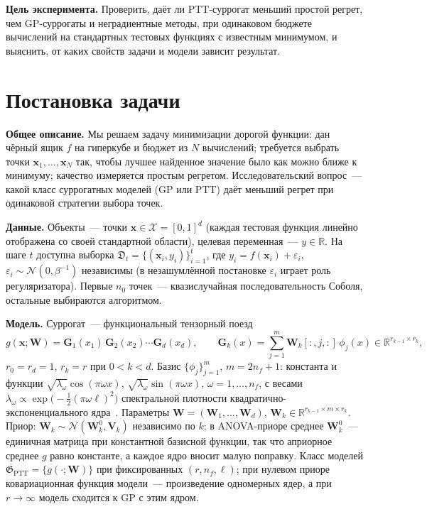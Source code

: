 \documentclass[11pt,a4paper]{article}
\newcommand{\X}{\mathcal X}
\newcommand{\R}{\mathbb R}
\newcommand{\x}{\mathbf x}
\newcommand{\W}{\mathbf W}
\newcommand{\G}{\mathbf G}
\begin{document}
\textbf{Цель эксперимента.} Проверить, даёт ли PTT-суррогат меньший простой регрет, чем GP-суррогаты и
неградиентные методы, при одинаковом бюджете вычислений на стандартных тестовых функциях с известным
минимумом, и выяснить, от каких свойств задачи и модели зависит результат.

\section{Постановка задачи}

\textbf{Общее описание.} Мы решаем задачу минимизации дорогой функции: дан чёрный ящик $f$ на
гиперкубе и бюджет из $N$ вычислений; требуется выбрать точки $\x_1,\dots,\x_N$ так, чтобы лучшее найденное
значение было как можно ближе к минимуму; качество измеряется простым регретом. Исследовательский вопрос~---
какой класс суррогатных моделей (GP или PTT) даёт меньший регрет при одинаковой стратегии выбора точек.

\textbf{Данные.} Объекты~--- точки $\x\in\X=[0,1]^d$ (каждая тестовая функция линейно отображена со своей
стандартной области), целевая переменная~--- $y\in\R$. На шаге $t$ доступна выборка
$\mathfrak D_t=\{(\x_i,y_i)\}_{i=1}^{t}$, где $y_i=f(\x_i)+\varepsilon_i$, $\varepsilon_i\sim\mathcal
N(0,\beta^{-1})$ независимы (в незашумлённой постановке $\varepsilon_i$ играет роль регуляризатора).
Первые $n_0$ точек~--- квазислучайная последовательность Соболя, остальные выбираются алгоритмом.

\textbf{Модель.} Суррогат~--- функциональный тензорный поезд
\begin{equation}\label{eq:ptt}
g(\x;\W)=\G_1(x_1)\,\G_2(x_2)\cdots\G_d(x_d),\qquad
\G_k(x)=\sum_{j=1}^{m}\W_k[:,j,:]\,\phi_j(x)\in\R^{r_{k-1}\times r_k},
\end{equation}
$r_0=r_d=1$, $r_k=r$ при $0<k<d$. Базис $\{\phi_j\}_{j=1}^{m}$, $m=2n_f+1$: константа и функции
$\sqrt{\lambda_\omega}\cos(\pi\omega x)$, $\sqrt{\lambda_\omega}\sin(\pi\omega x)$, $\omega=1,\dots,n_f$, с весами
$\lambda_\omega\propto\exp\bigl(-\tfrac12(\pi\omega\ell)^2\bigr)$ спектральной плотности квадратично-экспоненциального
ядра~\cite{solin2020hilbert}. Параметры $\W=(\W_1,\dots,\W_d)$, $\W_k\in\R^{r_{k-1}\times m\times r_k}$.
Приор: $\W_k\sim\mathcal N(\W_k^0,\mathbf V_k)$ независимо по $k$; в ANOVA-приоре среднее $\W_k^0$~---
единичная матрица при константной базисной функции, так что априорное среднее $g$ равно константе, а
каждое ядро вносит малую поправку. Класс моделей $\mathfrak G_{\mathrm{PTT}}=\{g(\cdot;\W)\}$ при
фиксированных $(r,n_f,\ell)$; при нулевом приоре ковариационная функция модели~--- произведение одномерных ядер, а при $r\to\infty$ модель сходится к GP с этим ядром.
\end{document}
